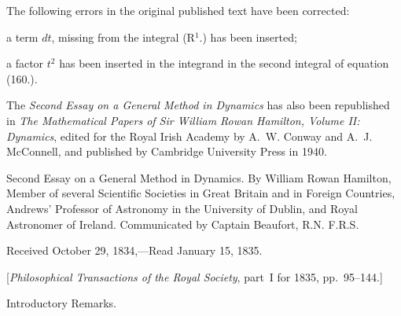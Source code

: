 The following errors in the original published text have been
corrected:

\smallskip

\item{}
a term $dt$, missing from the integral (R${}^1$.) has been inserted;

\smallskip

\item{}
a factor $t^2$ has been inserted in the
integrand in the second integral of equation (160.).

\smallskip

The {\it Second Essay on a General Method in Dynamics} has also
been republished in {\it The Mathematical Papers of Sir
William Rowan Hamilton, Volume II: Dynamics}, edited for
the Royal Irish Academy by A.~W. Conway and A.~J. McConnell, and
published by Cambridge University Press in 1940.

\bigbreak\bigskip


\vskip3pt



\vskip6pt


\vfill\eject


\null\vskip36pt

\noindent
{\largeit
Second Essay on a General Method in Dynamics.
By {\largesc William Rowan Hamilton}, Member of several Scientific
Societies in Great Britain and in Foreign Countries,
Andrews' Professor of Astronomy in the University of Dublin,
and Royal Astronomer of Ireland.  Communicated by
Captain {\largesc Beaufort}, R.N. F.R.S.}

\vskip12pt

\centerline{Received October 29, 1834,---Read January 15, 1835.}
\vskip12pt
\centerline{[{\it Philosophical Transactions of the Royal Society},
   part~I for 1835, pp.\ 95--144.]}

\bigbreak

{\sectiontitle
Introductory Remarks.\par}

\nobreak\bigskip

